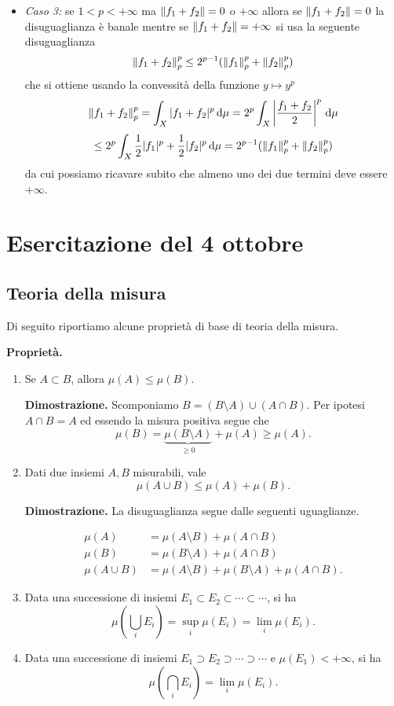 \documentclass[a4paper, 12pt]{report}
\begin{document}
\begin{itemize}
	\item \textit{Caso 3:} se $1 < p < +\infty$ ma $\left\lVert f_1 + f_2 \right\rVert = 0$ o $+\infty$ allora se $\left\lVert f_1 + f_2 \right\rVert = 0$ la disuguaglianza è banale mentre se $\left\lVert f_1 + f_2 \right\rVert = +\infty$ si usa la seguente disuguaglianza
		$$
		\left\lVert f_1 + f_2 \right\rVert_p^p \leq 2^{p-1} (\left\lVert f_1 \right\rVert_p^p + \left\lVert f_2 \right\rVert_p^p)
		$$
		che si ottiene usando la convessità della funzione $y \mapsto y^p$
		$$
		\left\lVert f_1 + f_2 \right\rVert_p^p 
		= \int_X |f_1 + f_2|^p \,\mathrm{d} \mu 
		= 2^p \int_X \left| \frac{f_1 + f_2}{2} \right|^p \,\mathrm{d} \mu 
		$$
		$$
		\leq 2^p \int_X \frac{1}{2} |f_1|^p + \frac{1}{2}|f_2|^p \,\mathrm{d} \mu 
		= 2^{p-1} (\left\lVert f_1 \right\rVert_p^p + \left\lVert f_2 \right\rVert_p^p)
		$$
		da cui possiamo ricavare subito che almeno uno dei due termini deve essere $+\infty$.

\end{itemize}

\section*{Esercitazione del 4 ottobre}

\subsection*{Teoria della misura}

Di seguito riportiamo alcune proprietà di base di teoria della misura.

\textbf{Proprietà.}

\begin{enumerate}
\item Se $A \subset B$, allora $\mu(A) \leq \mu(B)$.

\textbf{Dimostrazione.}
Scomponiamo $B = (B \setminus A) \cup (A \cap B)$. Per ipotesi $A \cap B = A$ ed essendo la misura positiva segue che
$$
	\mu(B) = \underbrace{\mu(B \setminus A)}_{\geq 0} + \mu(A) \geq \mu(A).
$$

\item \label{item:misura_unione_finita} Dati due insiemi $A,B$ misurabili, vale
$$
	\mu(A \cup B) \leq \mu(A) + \mu(B).
$$

\textbf{Dimostrazione.}
La disuguaglianza segue dalle seguenti uguaglianze.

\begin{align*}
	\mu(A) & = \mu(A \setminus B) + \mu(A \cap B) \\
	\mu(B) & = \mu(B \setminus A) + \mu(A \cap B) \\
	\mu(A \cup B) & = \mu(A \setminus B ) + \mu(B \setminus A) + \mu(A \cap B).
\end{align*}

\item Data una successione di insiemi $E_1 \subset E_2 \subset \cdots \subset \cdots$, si ha
$$
	\mu \left( \bigcup_{i} E_i \right) = \sup_i \mu(E_i) = \lim_i \mu (E_i).
$$

\item Data una successione di insiemi $E_1 \supset E_2 \supset \cdots \supset \cdots$ e $\mu(E_1) < +\infty$, si ha
$$
	\mu \left( \bigcap_{i} E_i \right) = \lim_i \mu (E_i).
$$
\end{enumerate}
\end{document}
